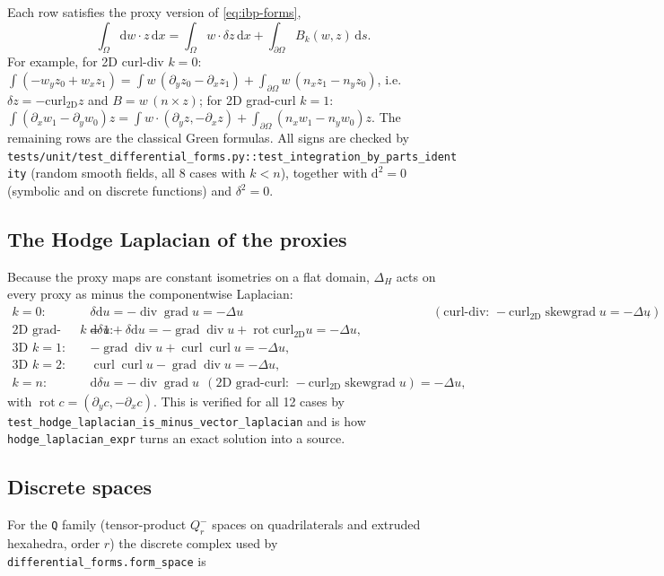\documentclass[11pt]{article}
\newcommand{\dd}{\mathrm{d}}
\newcommand{\cod}{\delta}
\newcommand{\curltwo}{\operatorname{curl_{2D}}}
\newcommand{\skewgrad}{\operatorname{skewgrad}}
\newcommand{\grad}{\operatorname{grad}}
\newcommand{\curl}{\operatorname{curl}}
\renewcommand{\div}{\operatorname{div}}
\newcommand{\code}[1]{\texttt{#1}}
\theoremstyle{remark}
\begin{document}
Each row satisfies the proxy version of \eqref{eq:ibp-forms},
\begin{equation}\label{eq:ibp}
  \int_\Omega \dd w\cdot z\,\dd x = \int_\Omega w\cdot \cod z\,\dd x + \int_{\partial\Omega} B_k(w,z)\,\dd s .
\end{equation}
For example, for 2D curl-div $k=0$:
$\int(-w_y z_0 + w_x z_1) = \int w\,(\partial_y z_0-\partial_x z_1) + \int_{\partial\Omega} w\,(n_x z_1-n_y z_0)$,
i.e.\ $\cod z=-\curltwo z$ and $B=w\,(n\times z)$; for 2D grad-curl $k=1$:
$\int(\partial_x w_1-\partial_y w_0)z = \int w\cdot(\partial_y z,-\partial_x z) + \int_{\partial\Omega}(n_x w_1-n_y w_0)z$.
The remaining rows are the classical Green formulas. All signs are checked by
\code{tests/unit/test\_differential\_forms.py::test\_integration\_by\_parts\_identity} (random
smooth fields, all 8 cases with $k<n$), together with $\dd^2=0$ (symbolic and on discrete
functions) and $\cod^2=0$.

\subsection{The Hodge Laplacian of the proxies}

Because the proxy maps are constant isometries on a flat domain, $\Delta_H$ acts on every proxy
as minus the componentwise Laplacian:
\[
\begin{array}{lll}
k=0: & \cod\dd u = -\div\grad u = -\Delta u & (\text{curl-div: } -\curltwo\skewgrad u = -\Delta u),\\[2pt]
\text{2D grad-curl } k=1: & \dd\cod u+\cod\dd u = -\grad\div u + \operatorname{rot}\curltwo u = -\Delta u,\\[2pt]
\text{3D } k=1: & -\grad\div u + \curl\curl u = -\Delta u,\\[2pt]
\text{3D } k=2: & \curl\curl u - \grad\div u = -\Delta u,\\[2pt]
k=n: & \dd\cod u = -\div\grad u \ \ (\text{2D grad-curl: } -\curltwo\skewgrad u) = -\Delta u,
\end{array}
\]
with $\operatorname{rot}c = (\partial_y c,-\partial_x c)$. This is verified for all 12 cases by
\code{test\_hodge\_laplacian\_is\_minus\_vector\_laplacian} and is how
\code{hodge\_laplacian\_expr} turns an exact solution into a source.

\subsection{Discrete spaces}

For the \code{Q} family (tensor-product $Q_r^-$ spaces on quadrilaterals and extruded hexahedra,
order $r$) the discrete complex used by \code{differential\_forms.form\_space} is
\end{document}

